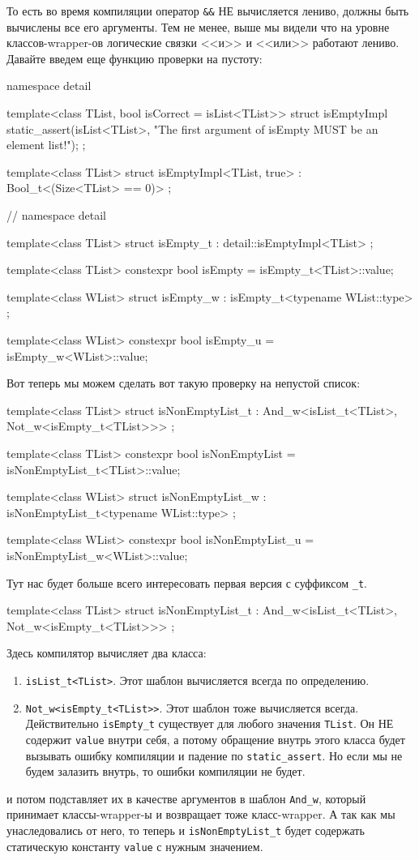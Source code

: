 То есть во время компиляции оператор \verb"&&" НЕ вычисляется лениво, должны быть вычислены все его аргументы.
Тем не менее, выше мы видели что на уровне классов-wrapper-ов логические связки <<и>> и <<или>> работают лениво.
Давайте введем еще функцию проверки на пустоту:
\begin{cppcode}
namespace detail {

template<class TList, bool isCorrect = isList<TList>>
struct isEmptyImpl {
  static_assert(isList<TList>,
                "The first argument of isEmpty MUST be an element list!");
};

template<class TList>
struct isEmptyImpl<TList, true> : Bool_t<(Size<TList> == 0)> {};
} // namespace detail

template<class TList>
struct isEmpty_t : detail::isEmptyImpl<TList> {};

template<class TList>
constexpr bool isEmpty = isEmpty_t<TList>::value;

template<class WList>
struct isEmpty_w : isEmpty_t<typename WList::type> {};

template<class WList>
constexpr bool isEmpty_u = isEmpty_w<WList>::value;
\end{cppcode}
Вот теперь мы можем сделать вот такую проверку на непустой список:
\begin{cppcode}
template<class TList>
struct isNonEmptyList_t : And_w<isList_t<TList>, Not_w<isEmpty_t<TList>>> {};

template<class TList>
constexpr bool isNonEmptyList = isNonEmptyList_t<TList>::value;

template<class WList>
struct isNonEmptyList_w : isNonEmptyList_t<typename WList::type> {};

template<class WList>
constexpr bool isNonEmptyList_u = isNonEmptyList_w<WList>::value;
\end{cppcode}
Тут нас будет больше всего интересовать первая версия с суффиксом \verb"_t".
\begin{cppcode}
template<class TList>
struct isNonEmptyList_t : And_w<isList_t<TList>, Not_w<isEmpty_t<TList>>> {};
\end{cppcode}
Здесь компилятор вычисляет два класса:
\begin{enumerate}
\item \verb"isList_t<TList>".
Этот шаблон вычисляется всегда по определению.

\item \verb"Not_w<isEmpty_t<TList>>".
Этот шаблон тоже вычисляется всегда.
Действительно \verb"isEmpty_t" существует для любого значения \verb"TList".
Он НЕ содержит \verb"value" внутри себя, а потому обращение внутрь этого класса будет вызывать ошибку компиляции и падение по \verb"static_assert".
Но если мы не будем залазить внутрь, то ошибки компиляции не будет.
\end{enumerate}
и потом подставляет их в качестве аргументов в шаблон \verb"And_w", который принимает классы-wrapper-ы и возвращает тоже класс-wrapper.
А так как мы унаследовались от него, то теперь и \verb"isNonEmptyList_t" будет содержать статическую константу \verb"value" с нужным значением.

